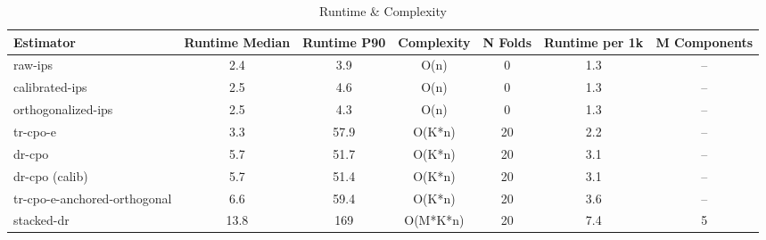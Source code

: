 \begin{table}[htbp]
\centering
\caption{Runtime & Complexity}
\label{tab:A6}
\begin{tabular}{l|cccccc}
\toprule
Estimator & Runtime Median & Runtime P90 & Complexity & N Folds & Runtime per 1k & M Components \\
\midrule
raw-ips & 2.4 & 3.9 & O(n) & 0 & 1.3 & -- \\
calibrated-ips & 2.5 & 4.6 & O(n) & 0 & 1.3 & -- \\
orthogonalized-ips & 2.5 & 4.3 & O(n) & 0 & 1.3 & -- \\
tr-cpo-e & 3.3 & 57.9 & O(K*n) & 20 & 2.2 & -- \\
dr-cpo & 5.7 & 51.7 & O(K*n) & 20 & 3.1 & -- \\
dr-cpo (calib) & 5.7 & 51.4 & O(K*n) & 20 & 3.1 & -- \\
tr-cpo-e-anchored-orthogonal & 6.6 & 59.4 & O(K*n) & 20 & 3.6 & -- \\
stacked-dr & 13.8 & 169 & O(M*K*n) & 20 & 7.4 & 5 \\
\bottomrule
\end{tabular}
\end{table}